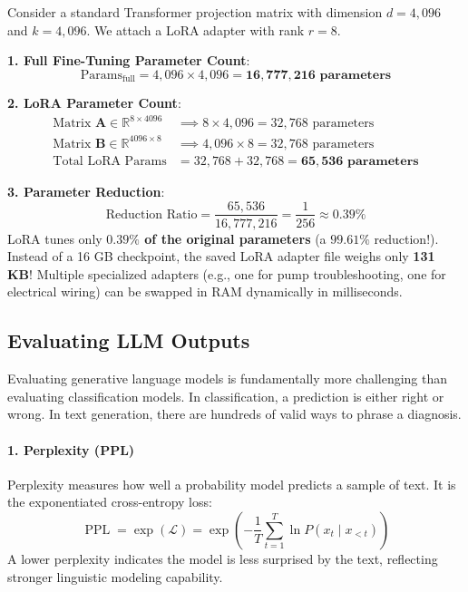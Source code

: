 \begin{example}
Consider a standard Transformer projection matrix with dimension $d = 4{,}096$ and $k = 4{,}096$. We attach a LoRA adapter with rank $r = 8$.

\textbf{1. Full Fine-Tuning Parameter Count}:
\begin{equation*}
\text{Params}_{\text{full}} = 4{,}096 \times 4{,}096 = \mathbf{16{,}777{,}216 \text{ parameters}}
\end{equation*}

\textbf{2. LoRA Parameter Count}:
\begin{align*}
\text{Matrix } \mathbf{A} \in \mathbb{R}^{8 \times 4096} &\implies 8 \times 4{,}096 = 32{,}768 \text{ parameters} \\
\text{Matrix } \mathbf{B} \in \mathbb{R}^{4096 \times 8} &\implies 4{,}096 \times 8 = 32{,}768 \text{ parameters} \\
\text{Total LoRA Params} &= 32{,}768 + 32{,}768 = \mathbf{65{,}536 \text{ parameters}}
\end{align*}

\textbf{3. Parameter Reduction}:
\begin{equation*}
\text{Reduction Ratio} = \frac{65{,}536}{16{,}777{,}216} = \frac{1}{256} \approx \mathbf{0.39\%}
\end{equation*}
LoRA tunes only \textbf{$0.39\%$ of the original parameters} (a $99.61\%$ reduction!). Instead of a 16 GB checkpoint, the saved LoRA adapter file weighs only \textbf{131 KB}! Multiple specialized adapters (e.g., one for pump troubleshooting, one for electrical wiring) can be swapped in RAM dynamically in milliseconds.
\end{example}

\subsection{Evaluating LLM Outputs}\label{subsec:llm_evaluation}

Evaluating generative language models is fundamentally more challenging than evaluating classification models. In classification, a prediction is either right or wrong. In text generation, there are hundreds of valid ways to phrase a diagnosis.

\paragraph{1. Perplexity (PPL)}
Perplexity measures how well a probability model predicts a sample of text. It is the exponentiated cross-entropy loss:
\begin{equation}
\operatorname{PPL} = \exp\left( \mathcal{L} \right) = \exp\left( -\frac{1}{T} \sum_{t=1}^T \ln P(x_t \mid x_{<t}) \right)\label{eq:perplexity}
\end{equation}
A lower perplexity indicates the model is less surprised by the text, reflecting stronger linguistic modeling capability.


